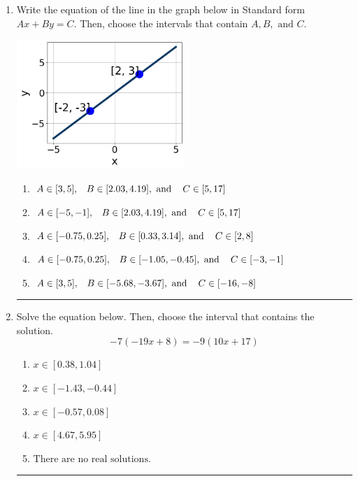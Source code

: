 \documentclass[14pt]{extbook}
\newcommand{\litem}[1]{\item#1\hspace*{-1cm}\rule{\textwidth}{0.4pt}}
\begin{document}
\begin{enumerate}
{\begin{enumerate}[label=\Alph*.]
\end{enumerate} }
\litem{
Write the equation of the line in the graph below in Standard form $Ax+By=C$. Then, choose the intervals that contain $A, B, \text{ and } C$.
\begin{center}
    \includegraphics[width=0.5\textwidth]{../Figures/linearGraphToStandardCopyB.png}
\end{center}
\begin{enumerate}[label=\Alph*.]
\item \( A \in [3, 5], \hspace{3mm} B \in [2.03, 4.19], \text{ and } \hspace{3mm} C \in [5, 17] \)
\item \( A \in [-5, -1], \hspace{3mm} B \in [2.03, 4.19], \text{ and } \hspace{3mm} C \in [5, 17] \)
\item \( A \in [-0.75, 0.25], \hspace{3mm} B \in [0.33, 3.14], \text{ and } \hspace{3mm} C \in [2, 8] \)
\item \( A \in [-0.75, 0.25], \hspace{3mm} B \in [-1.05, -0.45], \text{ and } \hspace{3mm} C \in [-3, -1] \)
\item \( A \in [3, 5], \hspace{3mm} B \in [-5.68, -3.67], \text{ and } \hspace{3mm} C \in [-16, -8] \)

\end{enumerate} }
\litem{
Solve the equation below. Then, choose the interval that contains the solution.\[ -7(-19x + 8) = -9(10x + 17) \]\begin{enumerate}[label=\Alph*.]
\item \( x \in [0.38, 1.04] \)
\item \( x \in [-1.43, -0.44] \)
\item \( x \in [-0.57, 0.08] \)
\item \( x \in [4.67, 5.95] \)
\item \( \text{There are no real solutions.} \)


\end{enumerate}}
\end{enumerate}
\end{document}
